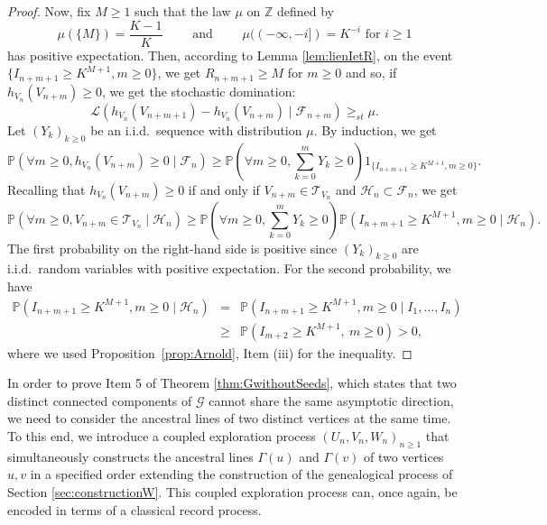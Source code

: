 \documentclass[french]{article}
\renewcommand{\P}{\mathbb{P}}
\newcommand{\T}{\mathcal{T}}
\newcommand{\Z}{\mathbb{Z}}
\renewcommand{\1}{\mathds{1}}
\begin{document}
\begin{proof}
Now, fix $M\ge 1$ such that the law $\mu$ on $\Z$ defined by 
\begin{equation}\label{eq:defimu}
\mu(\{M\})=\frac{K-1}{K} \qquad \mbox{ and } \qquad \mu((-\infty,-i])=K^{-i} \mbox{ for $i\ge 1$}
\end{equation}
has positive expectation. Then, according to Lemma \ref{lem:lienIetR}, on the event $\{I_{n+m+1}\ge K^{M+1}, m\ge 0\}$, we get $R_{n+m+1}\ge M$ for $m\ge 0$ and so, if $h_{V_n}(V_{n+m})\ge 0$, we get the stochastic domination:
$$\mathcal{L}(h_{V_n}(V_{n+m+1})-h_{V_n}(V_{n+m})\mid\mathcal{F}_{n+m})\ge_{st} \mu.$$
Let $(Y_k)_{k\ge 0}$ be an i.i.d.\ sequence with distribution $\mu$. By induction, we get
$$\P(\forall m\ge 0, h_{V_n}(V_{n+m})\ge 0 \mid \mathcal{F}_n)\ge \P(\forall m\ge 0, \sum_{k=0}^m Y_{k}\ge 0)1_{\{I_{n+m+1}\ge K^{M+1}, m\ge 0\}}.$$
Recalling that $h_{V_n}(V_{n+m})\ge 0$ if and only if $V_{n+m}\in \T_{V_n}$ and $\mathcal{H}_n\subset \mathcal{F}_n$, we get 
$$\P(\forall m\ge 0, V_{n+m}\in \T_{V_n} \mid \mathcal{H}_n)\ge \P(\forall m\ge 0, \sum_{k=0}^m Y_{k}\ge 0)\P(I_{n+m+1}\ge K^{M+1}, m\ge 0\mid\mathcal{H}_n).$$
The first probability on the right-hand side is positive since $(Y_k)_{k\ge 0}$ are i.i.d.\ random variables with positive expectation. For the second probability, we have
\begin{eqnarray*}
\P(I_{n+m+1}\ge K^{M+1}, m\ge 0\mid\mathcal{H}_n) &=& \P(I_{n+m+1}\ge K^{M+1}, m\ge 0\mid I_1,\ldots,I_n)\\
&\geq & \P(I_{m+2}\ge K^{M+1},\ m\ge0)>0,
\end{eqnarray*}
where we used Proposition~\ref{prop:Arnold}, Item (iii) for the inequality.
\end{proof}


In order to prove Item 5 of Theorem \ref{thm:GwithoutSeeds}, which states that two distinct connected components of $\mathcal{G}$ cannot share the same asymptotic direction, we need to consider the ancestral lines of two distinct vertices at the same time. To this end, we introduce a coupled exploration process $(U_n,V_n,W_n)_{n\ge 1}$ that simultaneously constructs the ancestral lines $\Gamma(u)$ and $\Gamma(v)$ of two vertices $u,v$ in a specified order extending the construction of the genealogical process of Section \ref{sec:constructionW}. This coupled exploration process can, once again, be encoded in terms of a classical record process.
\end{document}
